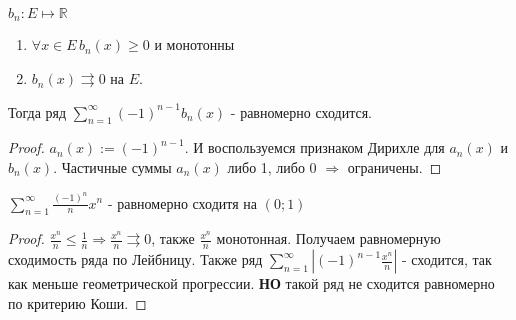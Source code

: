 \begin{theorem} \thmslashn

$b_n : E\mapsto \mathbb{R}$
\begin{enumerate}
\item
  $\forall x \in E \, b_n(x) \geqslant 0$ и монотонны
\item
  $b_n(x) \rightrightarrows 0$ на $E$.
\end{enumerate}
Тогда ряд $\sum\limits_{n = 1}^{\infty}{(-1)^{n-1}b_n(x)}$ - равномерно сходится.
  \begin{proof} \thmslashn
    
    $a_n(x):= (-1)^{n-1}$. И воспользуемся признаком Дирихле для $a_n(x)$ и $b_n(x)$. Частичные суммы $a_n(x)$ либо 1, либо 0 $\Rightarrow$ ограничены.
  \end{proof}
\end{theorem}

\begin{example}

  $\sum\limits_{n=1}^{\infty}{\frac{(-1)^n}{n}x^n}$ - равномерно сходитя на $(0; 1)$
  \begin{proof} \thmslashn

    $\frac{x^n}{n} \leqslant \frac{1}{n} \Rightarrow \frac{x^n}{n} \rightrightarrows 0$, также $\frac{x^n}{n}$ монотонная. Получаем равномерную сходимость ряда по Лейбницу.
    Также ряд $\sum\limits_{n = 1}^{\infty}{|(-1)^{n-1}\frac{x^n}{n}|}$ - сходится, так как меньше геометрической прогрессии. \textbf{НО} такой ряд не сходится равномерно по критерию Коши.

  \end{proof}
\end{example}
